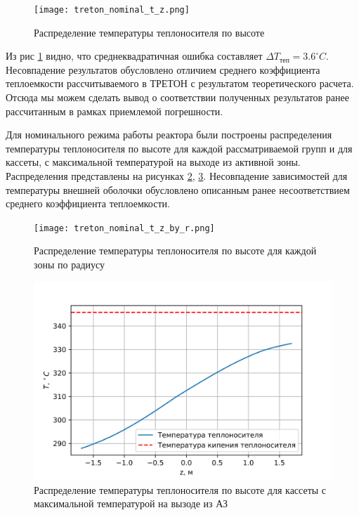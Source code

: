 \begin{figure}[H]
	\begin{center}
		\texttt{[image: treton\_nominal\_t\_z.png]}
		\caption{Распределение температуры теплоносителя по высоте}
		\label{pic:treton-t-tepl-compare-teplofiz} %
	\end{center}
\end{figure}

Из рис \ref{pic:treton-t-tepl-compare-teplofiz} видно, что среднеквадратичная ошибка составляет $\Delta {T_{\text{теп}}} = 3.6 ^\circ C$. Несовпадение результатов обусловлено отличием среднего коэффициента теплоемкости рассчитываемого в ТРЕТОН с результатом теоретического расчета. Отсюда мы можем сделать вывод о соответствии полученных результатов ранее рассчитанным в рамках приемлемой погрешности.

Для номинального режима работы реактора были построены распределения температуры теплоносителя по высоте для каждой рассматриваемой групп и для кассеты, с максимальной температурой на выходе из активной зоны. Распределения представлены на рисунках \ref{pic:treton-t-tepl-nominal-by-r}, \ref{pic:treton-t-tepl-nominal-max}. Несовпадение зависимостей для температуры внешней оболочки обусловлено описанным ранее несоответствием среднего коэффициента теплоемкости.

\begin{figure}[H]
	\begin{center}
		\texttt{[image: treton\_nominal\_t\_z\_by\_r.png]}
		\caption{Распределение температуры теплоносителя по высоте для каждой зоны по радиусу}
		\label{pic:treton-t-tepl-nominal-by-r} %
	\end{center}
\end{figure}

\begin{figure}[H]
	\begin{center}
		\includegraphics{treton_nominal_t_z_max.png}
		\caption{Распределение температуры теплоносителя по высоте для кассеты с максимальной температурой на вызоде из АЗ}
		\label{pic:treton-t-tepl-nominal-max} %
	\end{center}
\end{figure}

